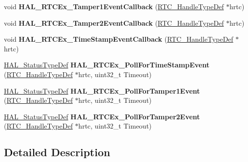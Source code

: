 \begin{DoxyCompactItemize}
\item 
\mbox{\label{group___r_t_c_ex___exported___functions___group1_gad849caf1e7b4774af56388a13636ba73}} 
void {\bfseries H\+A\+L\+\_\+\+R\+T\+C\+Ex\+\_\+\+Tamper1\+Event\+Callback} (\hyperlink{struct_r_t_c___handle_type_def}{R\+T\+C\+\_\+\+Handle\+Type\+Def} $\ast$hrtc)
\item 
\mbox{\label{group___r_t_c_ex___exported___functions___group1_ga14086326964355aaf3793ad3157ea7c3}} 
void {\bfseries H\+A\+L\+\_\+\+R\+T\+C\+Ex\+\_\+\+Tamper2\+Event\+Callback} (\hyperlink{struct_r_t_c___handle_type_def}{R\+T\+C\+\_\+\+Handle\+Type\+Def} $\ast$hrtc)
\item 
\mbox{\label{group___r_t_c_ex___exported___functions___group1_gac9ef67f1f1698e9560a5ecd5e8c9a330}} 
void {\bfseries H\+A\+L\+\_\+\+R\+T\+C\+Ex\+\_\+\+Time\+Stamp\+Event\+Callback} (\hyperlink{struct_r_t_c___handle_type_def}{R\+T\+C\+\_\+\+Handle\+Type\+Def} $\ast$hrtc)
\item 
\mbox{\label{group___r_t_c_ex___exported___functions___group1_gaff8adc3d27b9c84c69b64ffa6ad43457}} 
\hyperlink{stm32f0xx__hal__def_8h_a63c0679d1cb8b8c684fbb0632743478f}{H\+A\+L\+\_\+\+Status\+Type\+Def} {\bfseries H\+A\+L\+\_\+\+R\+T\+C\+Ex\+\_\+\+Poll\+For\+Time\+Stamp\+Event} (\hyperlink{struct_r_t_c___handle_type_def}{R\+T\+C\+\_\+\+Handle\+Type\+Def} $\ast$hrtc, uint32\+\_\+t Timeout)
\item 
\mbox{\label{group___r_t_c_ex___exported___functions___group1_gadea47894c36fc74044106654c081070b}} 
\hyperlink{stm32f0xx__hal__def_8h_a63c0679d1cb8b8c684fbb0632743478f}{H\+A\+L\+\_\+\+Status\+Type\+Def} {\bfseries H\+A\+L\+\_\+\+R\+T\+C\+Ex\+\_\+\+Poll\+For\+Tamper1\+Event} (\hyperlink{struct_r_t_c___handle_type_def}{R\+T\+C\+\_\+\+Handle\+Type\+Def} $\ast$hrtc, uint32\+\_\+t Timeout)
\item 
\mbox{\label{group___r_t_c_ex___exported___functions___group1_ga974cfcdcbc9a6fc70effcf1c701ba535}} 
\hyperlink{stm32f0xx__hal__def_8h_a63c0679d1cb8b8c684fbb0632743478f}{H\+A\+L\+\_\+\+Status\+Type\+Def} {\bfseries H\+A\+L\+\_\+\+R\+T\+C\+Ex\+\_\+\+Poll\+For\+Tamper2\+Event} (\hyperlink{struct_r_t_c___handle_type_def}{R\+T\+C\+\_\+\+Handle\+Type\+Def} $\ast$hrtc, uint32\+\_\+t Timeout)
\end{DoxyCompactItemize}


\subsection{Detailed Description}
